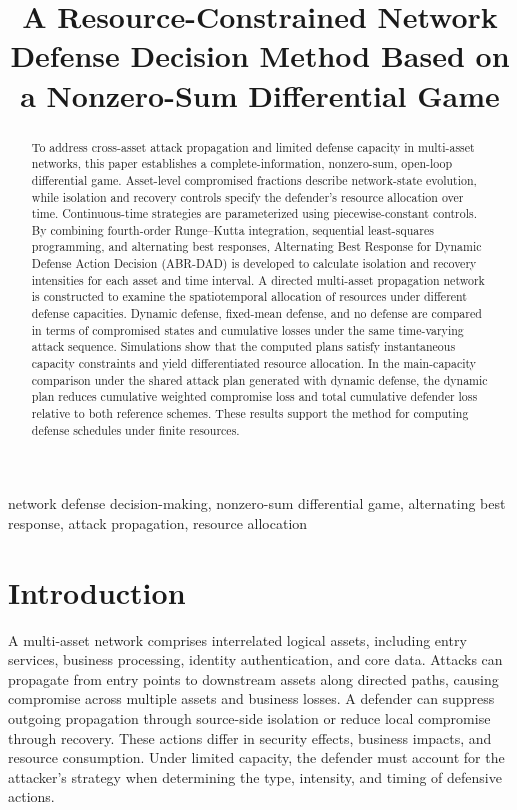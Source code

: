 \documentclass[conference,letterpaper]{IEEEtran}
\title{A Resource-Constrained Network Defense Decision Method Based on a Nonzero-Sum Differential Game}
\author{\IEEEauthorblockN{[First Name Last Name]$^{*}$ \qquad [First Name Last Name]}
\IEEEauthorblockA{[Department / School], [University or Organization]\\
\mbox{[City]}, [Postal Code], [Country]\\
\mbox{[corresponding.author@example.edu]}$^{*}$ \quad [coauthor@example.edu]}}
\begin{document}
\maketitle
\begin{abstract}
To address cross-asset attack propagation and limited defense capacity in multi-asset networks, this paper establishes a complete-information, nonzero-sum, open-loop differential game. Asset-level compromised fractions describe network-state evolution, while isolation and recovery controls specify the defender's resource allocation over time. Continuous-time strategies are parameterized using piecewise-constant controls. By combining fourth-order Runge--Kutta integration, sequential least-squares programming, and alternating best responses, Alternating Best Response for Dynamic Defense Action Decision (ABR-DAD) is developed to calculate isolation and recovery intensities for each asset and time interval. A directed multi-asset propagation network is constructed to examine the spatiotemporal allocation of resources under different defense capacities. Dynamic defense, fixed-mean defense, and no defense are compared in terms of compromised states and cumulative losses under the same time-varying attack sequence. Simulations show that the computed plans satisfy instantaneous capacity constraints and yield differentiated resource allocation. In the main-capacity comparison under the shared attack plan generated with dynamic defense, the dynamic plan reduces cumulative weighted compromise loss and total cumulative defender loss relative to both reference schemes. These results support the method for computing defense schedules under finite resources.
\end{abstract}
\begin{IEEEkeywords}
network defense decision-making, nonzero-sum differential game, alternating best response, attack propagation, resource allocation
\end{IEEEkeywords}

\section{Introduction}
A multi-asset network comprises interrelated logical assets, including entry services, business processing, identity authentication, and core data. Attacks can propagate from entry points to downstream assets along directed paths, causing compromise across multiple assets and business losses. A defender can suppress outgoing propagation through source-side isolation or reduce local compromise through recovery. These actions differ in security effects, business impacts, and resource consumption. Under limited capacity, the defender must account for the attacker's strategy when determining the type, intensity, and timing of defensive actions.
\end{document}
